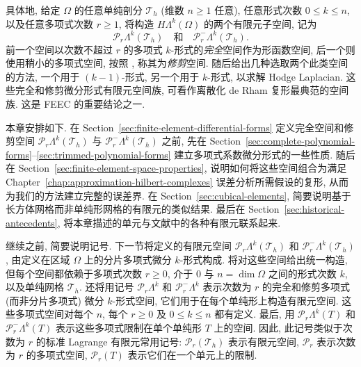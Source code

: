 {具体地, 给定 $\Omega$ 的任意单纯剖分 $\mathcal T_h$ (维数 $n\geq1$ 任意), 任意形式次数 $0\leq k\leq n$, 以及任意多项式次数 $r\geq1$, 将构造 $H\Lambda^k(\Omega)$ 的两个有限元子空间, 记为}
\[
\mathcal P_r\Lambda^k(\mathcal T_h)\quad{\text{和}}\quad\mathcal P_r^-\Lambda^k(\mathcal T_h).
\]
{前一个空间以次数不超过 $r$ 的多项式 $k$-形式的\emph{完全}空间作为形函数空间, 后一个则使用稍小的多项式空间, 按照 , 称其为\emph{修剪}空间. 随后给出几种选取两个此类空间的方法, 一个用于 $(k-1)$-形式, 另一个用于 $k$-形式, 以求解 Hodge Laplacian. 这些完全和修剪微分形式有限元空间族, 可看作离散化 de Rham 复形最典范的空间族. 这是 FEEC 的重要结论之一.}

{本章安排如下. 在 Section~\ref{sec:finite-element-differential-forms} 定义完全空间和修剪空间 $\mathcal P_r\Lambda^k(\mathcal T_h)$ 与 $\mathcal P_r^-\Lambda^k(\mathcal T_h)$ 之前, 先在 Section~\ref{sec:complete-polynomial-forms}--\ref{sec:trimmed-polynomial-forms} 建立多项式系数微分形式的一些性质. 随后在 Section~\ref{sec:finite-element-space-properties}, 说明如何将这些空间组合为满足 Chapter~\ref{chap:approximation-hilbert-complexes} 误差分析所需假设的复形, 从而为我们的方法建立完整的误差界. 在 Section~\ref{sec:cubical-elements}, 简要说明基于长方体网格而非单纯形网格的有限元的类似结果. 最后在 Section~\ref{sec:historical-antecedents}, 将本章描述的单元与文献中的各种有限元联系起来.}

{继续之前, 简要说明记号. 下一节将定义的有限元空间 $\mathcal P_r\Lambda^k(\mathcal T_h)$ 和 $\mathcal P_r^-\Lambda^k(\mathcal T_h)$, 由定义在区域 $\Omega$ 上的分片多项式微分 $k$-形式构成. 将对这些空间给出统一构造, 但每个空间都依赖于多项式次数 $r\geq0$, 介于 $0$ 与 $n=\dim\Omega$ 之间的形式次数 $k$, 以及单纯网格 $\mathcal T_h$. 还将用记号 $\mathcal P_r\Lambda^k$ 和 $\mathcal P_r^-\Lambda^k$ 表示次数为 $r$ 的完全和修剪多项式 (而非分片多项式) 微分 $k$-形式空间, 它们用于在每个单纯形上构造有限元空间. 这些多项式空间对每个 $n$, 每个 $r\geq0$ 及 $0\leq k\leq n$ 都有定义. 最后, 用 $\mathcal P_r\Lambda^k(T)$ 和 $\mathcal P_r^-\Lambda^k(T)$ 表示这些多项式限制在单个单纯形 $T$ 上的空间. 因此, 此记号类似于次数为 $r$ 的标准 Lagrange 有限元常用记号: $\mathcal P_r(\mathcal T_h)$ 表示有限元空间, $\mathcal P_r$ 表示次数为 $r$ 的多项式空间, $\mathcal P_r(T)$ 表示它们在一个单元上的限制.}
